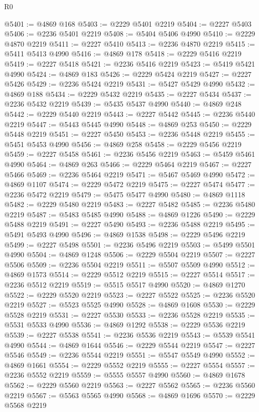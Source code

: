 \begin{lexlean}{R0}
\begin{coremodule}
@5401 := @4869 @168
@5403 := @2229 @5401 @2219
@5404 := @2227 @5403
@5406 := @2236 @5401 @2219
@5408 := @5404 @5406 @4990
@5410 := @2229 @4870 @2219
@5411 := @2227 @5410
@5413 := @2236 @4870 @2219
@5415 := @5411 @5413 @4990
@5416 := @4869 @178
@5418 := @2229 @5416 @2219
@5419 := @2227 @5418
@5421 := @2236 @5416 @2219
@5423 := @5419 @5421 @4990
@5424 := @4869 @183
@5426 := @2229 @5424 @2219
@5427 := @2227 @5426
@5429 := @2236 @5424 @2219
@5431 := @5427 @5429 @4990
@5432 := @4869 @188
@5434 := @2229 @5432 @2219
@5435 := @2227 @5434
@5437 := @2236 @5432 @2219
@5439 := @5435 @5437 @4990
@5440 := @4869 @248
@5442 := @2229 @5440 @2219
@5443 := @2227 @5442
@5445 := @2236 @5440 @2219
@5447 := @5443 @5445 @4990
@5448 := @4869 @253
@5450 := @2229 @5448 @2219
@5451 := @2227 @5450
@5453 := @2236 @5448 @2219
@5455 := @5451 @5453 @4990
@5456 := @4869 @258
@5458 := @2229 @5456 @2219
@5459 := @2227 @5458
@5461 := @2236 @5456 @2219
@5463 := @5459 @5461 @4990
@5464 := @4869 @263
@5466 := @2229 @5464 @2219
@5467 := @2227 @5466
@5469 := @2236 @5464 @2219
@5471 := @5467 @5469 @4990
@5472 := @4869 @1107
@5474 := @2229 @5472 @2219
@5475 := @2227 @5474
@5477 := @2236 @5472 @2219
@5479 := @5475 @5477 @4990
@5480 := @4869 @1118
@5482 := @2229 @5480 @2219
@5483 := @2227 @5482
@5485 := @2236 @5480 @2219
@5487 := @5483 @5485 @4990
@5488 := @4869 @1226
@5490 := @2229 @5488 @2219
@5491 := @2227 @5490
@5493 := @2236 @5488 @2219
@5495 := @5491 @5493 @4990
@5496 := @4869 @1538
@5498 := @2229 @5496 @2219
@5499 := @2227 @5498
@5501 := @2236 @5496 @2219
@5503 := @5499 @5501 @4990
@5504 := @4869 @1248
@5506 := @2229 @5504 @2219
@5507 := @2227 @5506
@5509 := @2236 @5504 @2219
@5511 := @5507 @5509 @4990
@5512 := @4869 @1573
@5514 := @2229 @5512 @2219
@5515 := @2227 @5514
@5517 := @2236 @5512 @2219
@5519 := @5515 @5517 @4990
@5520 := @4869 @1270
@5522 := @2229 @5520 @2219
@5523 := @2227 @5522
@5525 := @2236 @5520 @2219
@5527 := @5523 @5525 @4990
@5528 := @4869 @1608
@5530 := @2229 @5528 @2219
@5531 := @2227 @5530
@5533 := @2236 @5528 @2219
@5535 := @5531 @5533 @4990
@5536 := @4869 @1292
@5538 := @2229 @5536 @2219
@5539 := @2227 @5538
@5541 := @2236 @5536 @2219
@5543 := @5539 @5541 @4990
@5544 := @4869 @1644
@5546 := @2229 @5544 @2219
@5547 := @2227 @5546
@5549 := @2236 @5544 @2219
@5551 := @5547 @5549 @4990
@5552 := @4869 @1661
@5554 := @2229 @5552 @2219
@5555 := @2227 @5554
@5557 := @2236 @5552 @2219
@5559 := @5555 @5557 @4990
@5560 := @4869 @1678
@5562 := @2229 @5560 @2219
@5563 := @2227 @5562
@5565 := @2236 @5560 @2219
@5567 := @5563 @5565 @4990
@5568 := @4869 @1696
@5570 := @2229 @5568 @2219

\end{coremodule}
\end{lexlean}
